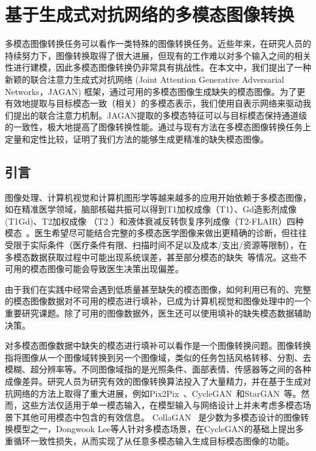\chapter{基于生成式对抗网络的多模态图像转换}

多模态图像转换任务可以看作一类特殊的图像转换任务。近些年来，在研究人员的持续努力下，图像转换取得了很大进展，但现有的工作难以对多个输入之间的相关性进行建模，因此多模态图像转换仍非常具有挑战性。在本文中，我们提出了一种新颖的联合注意力生成式对抗网络 (Joint Attention Generative Adversarial Networks，JAGAN) 框架，通过可用的多模态图像生成缺失的模态图像。为了更有效地提取与目标模态一致（相关）的多模态表示，我们使用自表示网络来驱动我们提出的联合注意力机制。JAGAN提取的多模态特征可以与目标模态保持通道级的一致性，极大地提高了图像转换性能。通过与现有方法在多模态图像转换任务上定量和定性比较，证明了我们方法的能够生成更精准的缺失模态图像。

\section{引言}

图像处理、计算机视觉和计算机图形学等越来越多的应用开始依赖于多模态图像，如在精准医学领域，脑部核磁共振可以得到T1加权成像（T1）、Gd造影剂成像(T1Gd)、T2加权成像 （T2 ）和液体衰减反转恢复序列成像（T2-FLAIR）四种模态~\cite{drevelegas2011imaging}。医生希望尽可能结合完整的多模态医学图像来做出更精确的诊断，但往往受限于实际条件（医疗条件有限、扫描时间不足以及成本/支出/资源等限制），在多模态数据获取过程中可能出现系统误差，甚至部分模态的缺失~\cite{tanenbaum2017synthetic}等情况。这些不可用的模态图像可能会导致医生决策出现偏差。

由于我们在实践中经常会遇到低质量甚至缺失的模态图像，如何利用已有的、完整的模态图像数据对不可用的模态进行填补，已成为计算机视觉和图像处理中的一个重要研究课题。除了可用的图像数据外，医生还可以使用填补的缺失模态数据辅助决策。

对多模态图像数据中缺失的模态进行填补可以看作是一个图像转换问题。图像转换指将图像从一个图像域转换到另一个图像域，类似的任务包括风格转移、分割、去模糊、超分辨率等。不同图像域指的是光照条件、面部表情、传感器等之间的各种成像差异。研究人员为研究有效的图像转换算法投入了大量精力，并在基于生成对抗网络的方法上取得了重大进展，例如Pix2Pix~\cite{pix2pix}、CycleGAN~\cite{cyclegan}和StarGAN~\cite{stargan}等。然而，这些方法仅适用于单一模态输入，在模型输入与网络设计上并未考虑多模态场景下其他可用模态中包含的有效信息。 CollaGAN~\cite{collagan} 是少数为多模态设计的图像转换模型之一，Dongwook Lee等人针对多模态场景，在CycleGAN的基础上提出多重循环一致性损失，从而实现了从任意多模态输入生成目标模态图像的功能。

